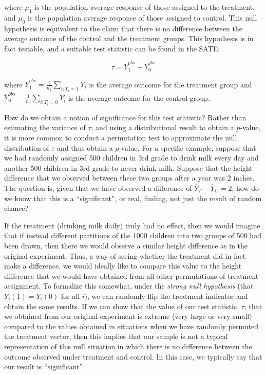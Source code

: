 where $\mu_1$ is the population average response of those assigned to the treatment, and $\mu_0$ is the population average response of those assigned to control. This null hypothesis is equivalent to the claim that there is no difference between the average outcome of the control and the treatment groups. This hypothesis is in fact testable, and a suitable test statistic can be found in the SATE:

$$\tau = \overline{Y}_1^{obs} - \overline{Y}_0^{obs}$$

where $\overline{Y}_1^{obs} = \frac{1}{n_1} \sum_{i:T_i = 1}Y_i$ is the average outcome for the treatment group and $\overline{Y}_0^{obs} = \frac{1}{n_0} \sum_{i:T_i = 0}Y_i$ is the average outcome for the control group.

How do we obtain a notion of significance for this test statistic? Rather than estimating the variance of $\tau$, and using a distributional result to obtain a $p$-value, it is more common to conduct a permutation test to approximate the null distribution of $\tau$ and thus obtain a $p$-value. For a specific example, suppose that we had randomly assigned 500 children in 3rd grade to drink milk every day and another 500 children in 3rd grade to never drink milk. Suppose that the height difference that we observed between these two groups after a year was 2 inches. The question is, given that we have observed a difference of $\overline{Y}_T - \overline{Y}_C = 2$, how do we know that this is a ``significant'', or real, finding, not just the result of random chance?

If the treatment (drinking milk daily) truly had no effect, then we would imagine that if instead different partitions of the 1000 children into two groups of 500 had been drawn, then there we would observe a similar height difference as in the original experiment. Thus, a way of seeing whether the treatment did in fact make a difference, we would ideally like to compare this value to the height difference that we would have obtained from all other permutations of treatment assignment. To formalize this somewhat, under the \emph{strong null hypothesis} (that $Y_i(1) = Y_i(0)$ for all $i$), we can randomly flip the treatment indicator and obtain the same results. If we can show that the value of our test statistic, $\tau$, that we obtained from our original experiment is extreme (very large or very small) compared to the values obtained in situations when we have randomly permuted the treatment vector, then this implies that our sample is not a typical representation of this null situation in which there is no difference between the outcome observed under treatment and control. In this case, we typically say that our result is ``significant''.



